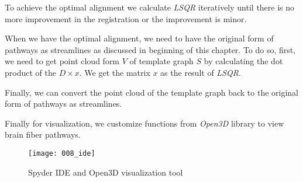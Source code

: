\documentclass[../structure.tex]{subfiles}
\begin{document}
To achieve the optimal alignment we calculate \textit{LSQR} iteratively until there is no more improvement in the registration or the improvement is minor.

When we have the optimal alignment, we need to have the original form of pathways as streamlines as discussed in beginning of this chapter. To do so, first, we need to get point cloud form $V$ of template graph $S$ by calculating the dot product of the $D\times x$. We get the matrix $x$ as the result of \textit{LSQR}. 

Finally, we can convert the point cloud of the template graph back to the original form of pathways as streamlines.

Finally for visualization, we customize functions from \textit{Open3D} \cite{Zhou2018} library to view brain fiber pathways.

\begin{figure}[h!]
\centering
\texttt{[image: 008\_ide]}
\captionsetup{justification=centering}
\caption{Spyder IDE and Open3D visualization tool}
\end{figure}
\end{document}
